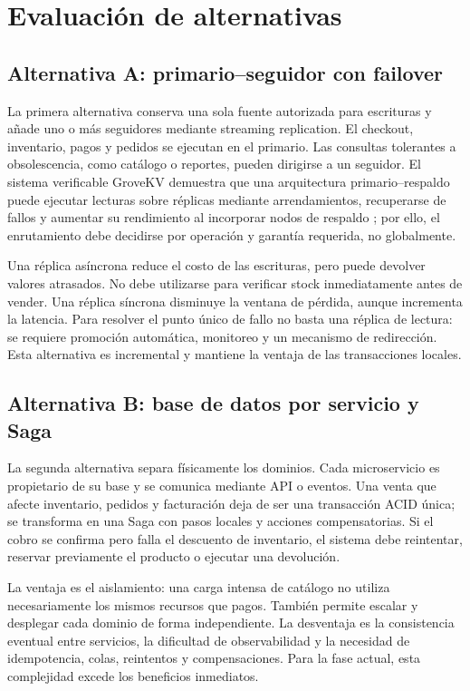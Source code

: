 \documentclass[11pt,a4paper]{article}
\begin{document}
\section{Evaluación de alternativas}

\subsection{Alternativa A: primario--seguidor con failover}

La primera alternativa conserva una sola fuente autorizada para escrituras y añade uno o más seguidores mediante streaming replication. El checkout, inventario, pagos y pedidos se ejecutan en el primario. Las consultas tolerantes a obsolescencia, como catálogo o reportes, pueden dirigirse a un seguidor. El sistema verificable GroveKV demuestra que una arquitectura primario--respaldo puede ejecutar lecturas sobre réplicas mediante arrendamientos, recuperarse de fallos y aumentar su rendimiento al incorporar nodos de respaldo \cite{sharma2023grove}; por ello, el enrutamiento debe decidirse por operación y garantía requerida, no globalmente.

Una réplica asíncrona reduce el costo de las escrituras, pero puede devolver valores atrasados. No debe utilizarse para verificar stock inmediatamente antes de vender. Una réplica síncrona disminuye la ventana de pérdida, aunque incrementa la latencia. Para resolver el punto único de fallo no basta una réplica de lectura: se requiere promoción automática, monitoreo y un mecanismo de redirección. Esta alternativa es incremental y mantiene la ventaja de las transacciones locales.

\subsection{Alternativa B: base de datos por servicio y Saga}

La segunda alternativa separa físicamente los dominios. Cada microservicio es propietario de su base y se comunica mediante API o eventos. Una venta que afecte inventario, pedidos y facturación deja de ser una transacción ACID única; se transforma en una Saga con pasos locales y acciones compensatorias. Si el cobro se confirma pero falla el descuento de inventario, el sistema debe reintentar, reservar previamente el producto o ejecutar una devolución.

La ventaja es el aislamiento: una carga intensa de catálogo no utiliza necesariamente los mismos recursos que pagos. También permite escalar y desplegar cada dominio de forma independiente. La desventaja es la consistencia eventual entre servicios, la dificultad de observabilidad y la necesidad de idempotencia, colas, reintentos y compensaciones. Para la fase actual, esta complejidad excede los beneficios inmediatos.
\end{document}
